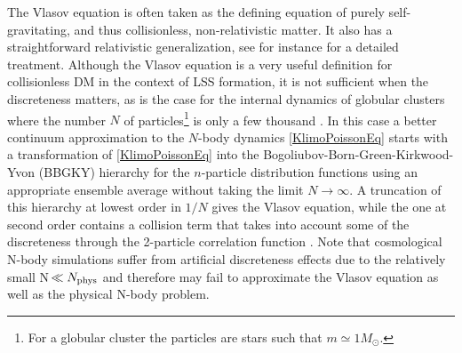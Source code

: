 \documentclass[twocolumn, nofootinbib, showpacs, superscriptaddress]{revtex4-1}
\begin{document}
The Vlasov equation is often taken as the defining equation of purely self-gravitating, and thus collisionless, non-relativistic matter. 
It also has a straightforward relativistic generalization, see for instance \cite{Choquet-Bruhat2008} for a detailed treatment. 
Although the Vlasov equation is a very useful definition for collisionless DM in the context of LSS formation, it is not sufficient
when the discreteness matters, as is the case for the internal dynamics of globular clusters 
where the number $N$ of particles\footnote{For a globular cluster the particles are stars such that $m\simeq 1 M_\odot$.} is only a 
few thousand  \cite{G68}.
In this case a better continu\-um approximation to the $N$-body dynamics \eqref{KlimoPoissonEq} starts with a transformation of \eqref{KlimoPoissonEq} into the Bogoliubov-Born-Green-Kirkwood-Yvon (BBGKY) hierarchy for the $n$-particle distribution functions using an appropriate ensemble average without taking the limit $N\rightarrow \infty$. 
A truncation of this hierarchy at lowest order in $1/N$ gives the Vlasov equation, while the one at second order contains a collision term that takes into account some of the discreteness through the 2-particle correlation function \cite{G68,BT08,Chavanis2008}.  
Note that cosmological N-body simulations suffer from artificial discreteness effects due to the relatively small N$\,\ll N_{\rm phys}$ and therefore may fail to approximate the Vlasov equation as well as the physical N-body problem.
\end{document}
